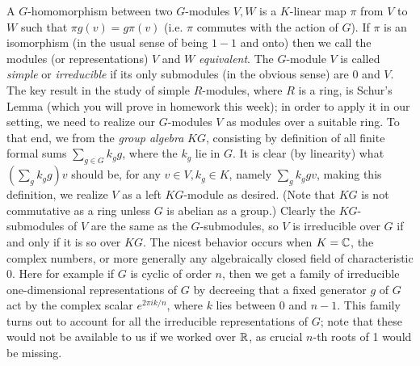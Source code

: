 \documentclass[10pt]{article}
\begin{document}
 A $G$-homomorphism between two $G$-modules $V,W$ is a $K$-linear map
 $\pi$ from $V$ to $W$ such that $\pi g(v) = g\pi(v)$ (i.e. $\pi$
 commutes with the action of $G$). If $\pi$ is an isomorphism (in the
 usual sense of being $1-1$ and onto) then we call the modules (or
 representations) $V$ and $W$ {\sl equivalent}. The $G$-module $V$ is
 called {\sl simple} or {\sl irreducible} if its only submodules (in the
 obvious sense) are 0 and $V$. The key result in the study of simple
 $R$-modules, where $R$ is a ring, is Schur's Lemma (which you will
 prove in homework this week); in order to apply it in our setting, we
 need to realize our $G$-modules $V$ as modules over a suitable ring. To
 that end, we from the {\sl group algebra} $KG$, consisting by
 definition of all finite formal sums $\sum_{g\in G} k_g g$, where the
 $k_g$ lie in $G$. It is clear (by linearity) what $(\sum_g k_g g)v$
 should be, for any $v\in V,k_g\in K$, namely $\sum_g k_g gv$, making
 this definition, we realize $V$ as a left $KG$-module as desired. (Note
 that $KG$ is not commutative as a ring unless $G$ is abelian as a
 group.) Clearly the $KG$-submodules of $V$ are the same as the
 $G$-submodules, so $V$ is irreducible over $G$ if and only if it is so
 over $KG$. The nicest behavior occurs when $K=\Bbb C$, the complex
 numbers, or more generally any algebraically closed field of
 characteristic 0. Here for example if $G$ is cyclic of order $n$, then
 we get a family of irreducible one-dimensional representations of $G$
 by decreeing that a fixed generator $g$ of $G$ act by the complex
 scalar $e^{2\pi ik/n}$, where $k$ lies between 0 and $n-1$. This family
 turns out to account for all the irreducible representations of $G$;
 note that these would not be available to us if we worked over $\Bbb
 R$, as crucial $n$-th roots of 1 would be missing.
\end{document}
